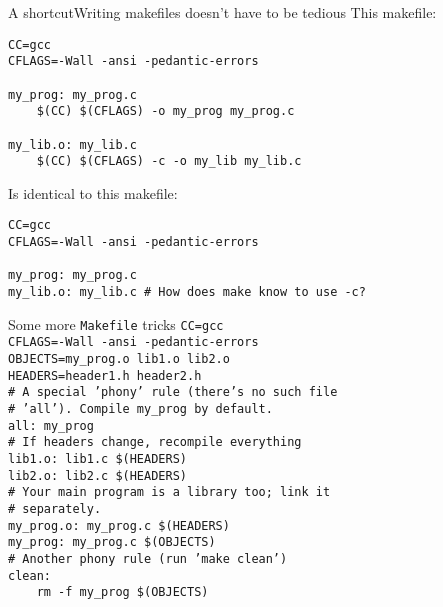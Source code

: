 \documentclass[handout]{beamer}
\begin{document}
\begin{frame}{A shortcut}{Writing makefiles doesn't have to be tedious}
\small
This makefile:

\texttt{CC=gcc \\
CFLAGS=-Wall -ansi -pedantic-errors \\
~\\
my\_prog: my\_prog.c \\
~~~~\$(CC) \$(CFLAGS) -o my\_prog my\_prog.c \\
~\\
my\_lib.o: my\_lib.c \\
~~~~\$(CC) \$(CFLAGS) -c -o my\_lib my\_lib.c \\
}

Is identical to this makefile:

\texttt{CC=gcc \\
CFLAGS=-Wall -ansi -pedantic-errors \\
~\\
my\_prog: my\_prog.c \\
my\_lib.o: my\_lib.c  \# How does make know to use -c?\\
}
\end{frame}

\begin{frame}{Some more \texttt{Makefile} tricks}
\footnotesize
\texttt{CC=gcc \\
CFLAGS=-Wall -ansi -pedantic-errors \\
OBJECTS=my\_prog.o lib1.o lib2.o \\
HEADERS=header1.h header2.h \\
\# A special 'phony' rule (there's no such file \\
\# 'all'). Compile my\_prog by default. \\
all: my\_prog \\
\# If headers change, recompile everything\\
lib1.o: lib1.c \$(HEADERS) \\
lib2.o: lib2.c \$(HEADERS) \\
\# Your main program is a library too; link it \\
\# separately. \\
my\_prog.o: my\_prog.c \$(HEADERS) \\
my\_prog: my\_prog.c \$(OBJECTS) \\
\# Another phony rule (run 'make clean') \\
clean: \\
~~~~rm -f my\_prog \$(OBJECTS)
}
\end{frame}
\end{document}
